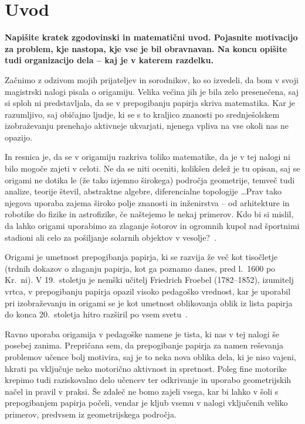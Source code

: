 \section{Uvod}

\textbf{Napišite kratek zgodovinski in matematični uvod.  Pojasnite motivacijo za problem, kje nastopa, kje vse je bil obravnavan. Na koncu opišite tudi organizacijo dela -- kaj je v katerem razdelku.}

Začnimo z odzivom mojih prijateljev in sorodnikov, ko so izvedeli, da bom v svoji magistrski nalogi pisala o origamiju. Velika večina jih je bila zelo presenečena, saj si sploh ni predstavljala, da se v prepogibanju papirja skriva matematika. Kar je razumljivo, saj običajno ljudje, ki se s to kraljico znanosti po srednješolskem izobraževanju prenehajo aktivneje ukvarjati, njenega vpliva na vse okoli nas ne opazijo.

In resnica je, da se v origamiju razkriva toliko matematike, da je v tej nalogi ni bilo mogoče zajeti v celoti. Ne da se niti oceniti, kolikšen delež je tu opisan, saj se origami ne dotika le (že tako izjemno širokega) področja geometrije, temveč tudi analize, teorije števil, abstraktne algebre, diferencialne topologije \ldots Prav tako njegova uporaba zajema široko polje znanosti in inženirstva -- od arhitekture in robotike do fizike in astrofizike, če naštejemo le nekaj primerov. Kdo bi si mislil, da lahko origami uporabimo za zlaganje šotorov in ogromnih kupol nad športnimi stadioni ali celo za pošiljanje solarnih objektov v vesolje?~\cite[str.\ 3--5]{hull2020}.

Origami je umetnost prepogibanja papirja, ki se razvija že več kot tisočletje (trdnih dokazov o zlaganju papirja, kot ga poznamo danes, pred l.\ 1600 po Kr.\ ni). V 19.\ stoletju je nemški učitelj Friedrich Froebel (1782--1852), izumitelj vrtca, v prepogibanju papirja opazil visoko pedagoško vrednost, kar je uporabil pri izobraževanju in origami se je kot umetnost oblikovanja oblik iz lista papirja do konca 20.\ stoletja hitro razširil po vsem svetu~\cite{robinson2024}.

Ravno uporaba origamija v pedagoške namene je tista, ki nas v tej nalogi še posebej zanima. Prepričana sem, da prepogibanje papirja za namen reševanja problemov učence bolj motivira, saj je to neka nova oblika dela, ki je niso vajeni, hkrati pa vključuje neko motorično aktivnost in spretnost. Poleg fine motorike krepimo tudi raziskovalno delo učencev ter odkrivanje in uporabo geometrijskih načel in pravil v praksi. Še zdaleč ne bomo zajeli vsega, kar bi lahko v šoli s prepogibanjem papirja počeli, vendar je kljub vsemu v nalogi vključenih veliko primerov, predvsem iz geometrijskega področja.

